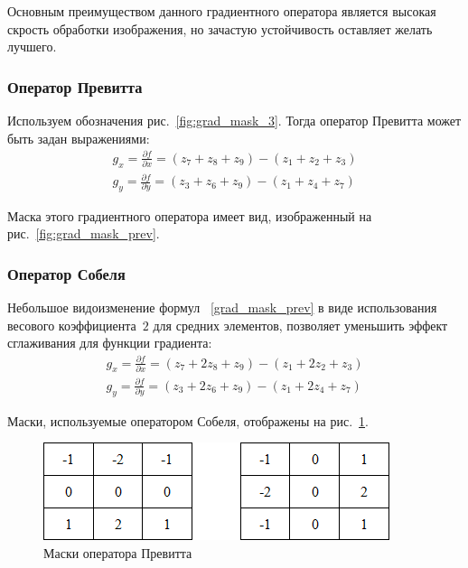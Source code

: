 \documentclass[12pt]{article} %
\begin{document}
Основным преимуществом данного градиентного оператора является высокая скрость обработки изображения, но зачастую устойчивость оставляет желать лучшего. 

\subsubsection{Оператор Превитта}

Используем обозначения рис.~\ref{fig:grad_mask_3}. Тогда оператор Превитта может быть задан выражениями:
\begin{gather}\label{grad_mask_prev}
	g_x = \frac{\partial f}{\partial x} = (z_7+z_8+z_9)-(z_1+z_2+z_3)\\
	g_y = \frac{\partial f}{\partial y} = (z_3+z_6+z_9)-(z_1+z_4+z_7)
\end{gather}

Маска этого градиентного оператора имеет вид, изображенный на рис.~\ref{fig:grad_mask_prev}.

\subsubsection{Оператор Собеля}

Небольшое видоизменение формул ~\ref{grad_mask_prev} в виде использования весового коэффициента~$2$ для средних элементов, позволяет уменьшить эффект сглаживания для функции градиента:
\begin{gather}\label{grad_mask_sob}
	g_x = \frac{\partial f}{\partial x} = (z_7+2z_8+z_9)-(z_1+2z_2+z_3)\\
	g_y = \frac{\partial f}{\partial y} = (z_3+2z_6+z_9)-(z_1+2z_4+z_7)
\end{gather}

\newpage

Маски, используемые оператором Собеля, отображены на рис.~\ref{fig:grad_mask_sob}.

\begin{figure}[h]
	
	\centering
	
	\includegraphics[width=0.4\linewidth]{grad_mask_sob.jpg}
	
	\caption{Маски оператора Превитта}
	
	\label{fig:grad_mask_sob}
	
\end{figure}
\end{document}
